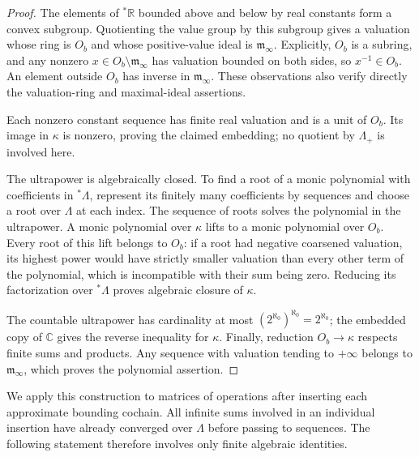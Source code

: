 \documentclass[11pt]{article}
\numberwithin{equation}{section}
\theoremstyle{definition}
\theoremstyle{remark}
\begin{document}
\begin{proof}
The elements of ${}^*\mathbb R$ bounded above and below by real constants
form a convex subgroup.  Quotienting the value group by this subgroup
gives a valuation whose ring is $O_b$ and whose positive-value ideal
is $\mathfrak m_\infty$.  Explicitly, $O_b$ is a subring, and any
nonzero $x\in O_b\setminus\mathfrak m_\infty$ has valuation bounded
on both sides, so $x^{-1}\in O_b$.  An element outside $O_b$ has inverse
in $\mathfrak m_\infty$.  These observations also verify directly the
valuation-ring and maximal-ideal assertions.

Each nonzero constant sequence has finite real valuation and is a
unit of $O_b$.  Its image in $\kappa$ is nonzero, proving the claimed
embedding; no quotient by $\Lambda_+$ is involved here.

The ultrapower is algebraically closed.  To find a root of a monic
polynomial with coefficients in ${}^*\Lambda$, represent its finitely
many coefficients by sequences and choose a root over $\Lambda$ at
each index.  The sequence of roots solves the polynomial in the
ultrapower.  A monic polynomial over $\kappa$ lifts to a monic
polynomial over $O_b$.  Every root of this lift belongs to $O_b$:
if a root had negative coarsened valuation, its highest power would
have strictly smaller valuation than every other term of the
polynomial, which is incompatible with their sum being zero.
Reducing its factorization over ${}^*\Lambda$ proves algebraic closure
of $\kappa$.

The countable ultrapower has cardinality at most
$(2^{\aleph_0})^{\aleph_0}=2^{\aleph_0}$; the embedded copy of $\mathbb C$
gives the reverse inequality for $\kappa$.  Finally, reduction
$O_b\to\kappa$ respects finite sums and products.  Any sequence with
valuation tending to $+\infty$ belongs to $\mathfrak m_\infty$, which
proves the polynomial assertion.
\end{proof}

We apply this construction to matrices of operations after inserting
each approximate bounding cochain.  All infinite sums involved in an
individual insertion have already converged over $\Lambda$ before
passing to sequences.  The following statement therefore involves
only finite algebraic identities.
\end{document}
